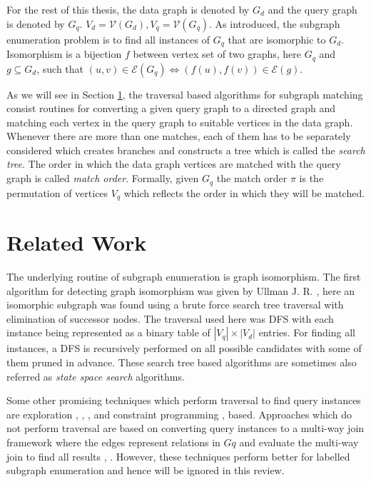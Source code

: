 For the rest of this thesis, the data graph is denoted by $G_d$ and the query graph is denoted by $G_q$. $V_d =  \mathcal{V}(G_d), V_q = \mathcal{V}(G_q)$.
As introduced, the subgraph enumeration problem is to find all instances of $G_q$ that are isomorphic to $G_d$.
Isomorphism is a bijection $f$ between vertex set of two graphs, here $G_q$ and $g \subseteq G_d$, such that $ (u,v) \in \mathcal{E}(G_q) \Leftrightarrow (f(u), f(v)) \in \mathcal{E}(g)$.

As we will see in Section \ref{sec:LIT-r}, the traversal based algorithms for subgraph matching consist routines for converting a given query graph to a directed graph and matching each vertex in the query graph to suitable vertices in the data graph. Whenever there are more than one matches, each of them has to be separately considered which creates branches and constructs a tree which is called the \textit{search tree}.
The order in which the data graph vertices are matched with the query graph is called \textit{match order}. Formally, given $G_q$ the match order $\pi$ is the permutation of vertices $V_q$ which reflects the order in which they will be matched.

\section{Related Work} \label{sec:LIT-r}
The underlying routine of subgraph enumeration is graph isomorphism.
The first algorithm for detecting graph isomorphism was given by Ullman J. R. \cite{ullman_sgm}, here an isomorphic subgraph was found using a brute force search tree traversal with elimination of successor nodes.
The traversal used here was DFS with each instance being represented as a binary table of $|V_q|\times |V_d|$ entries.
For finding all instances, a DFS is recursively performed on all possible candidates with some of them pruned in advance.
These search tree based algorithms are sometimes also referred as \textit{state space search} algorithms.

Some other promising techniques which perform traversal to find query instances are exploration \cite{expl-based1}, \cite{expl-based2}, \cite{expl-based3}, \cite{expl-based4} and constraint programming \cite{cp-based-sgm1}, \cite{cp-based-sgm2} based.
Approaches which do not perform traversal are based on converting query instances to a multi-way join framework where the edges represent relations in $Gq$ and evaluate the multi-way join to find all results \cite{mapreduce}, \cite{mapreduce-dist}.
However, these techniques perform better for labelled subgraph enumeration \cite{sgm-techniques} and hence will be ignored in this review.


